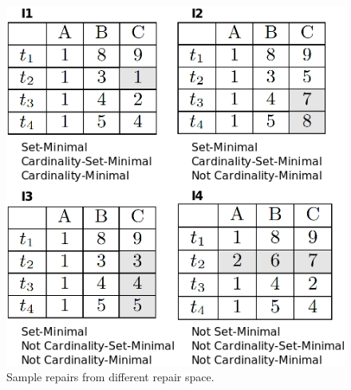 \begin{figure}
   \centering
   \includegraphics[scale=0.35]{cardinalityEg.png}
   \caption{Sample repairs from different repair space.}
   \label{fig:cardinalityEg}
\end{figure}
